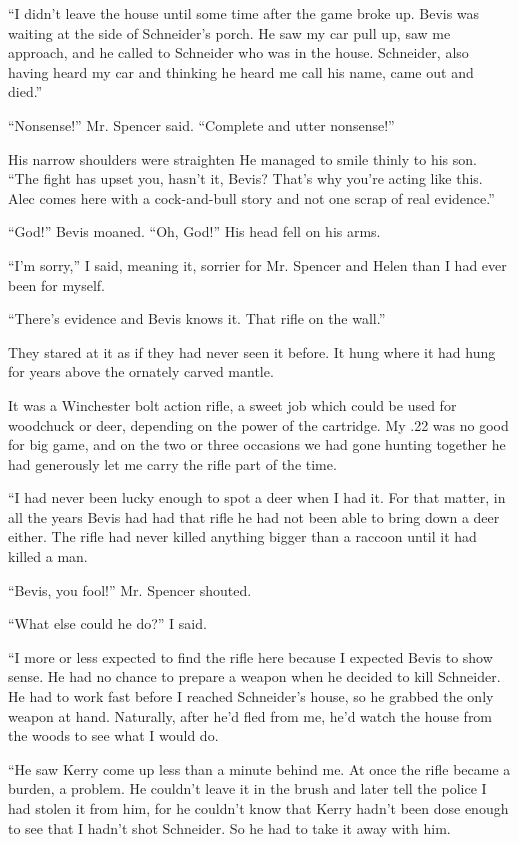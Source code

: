 \documentclass{novel}
\begin{document}
“I didn’t leave the house until some time after the game broke up. Bevis was waiting at the side of Schneider’s porch. He saw my car pull up, saw me approach, and he called to Schneider who was in the house. Schneider, also having heard my car and thinking he heard me call his name, came out and died.”

“Nonsense!” Mr. Spencer said. “Complete and utter nonsense!” 

His narrow shoulders were straighten He managed to smile thinly to his son. “The fight has upset you, hasn’t it, Bevis? That’s why you’re acting like this. Alec comes here with a cock-and-bull story and not one scrap of real evidence.”

“God!” Bevis moaned. “Oh, God!” His head fell on his arms.

“I’m sorry,” I said, meaning it, sorrier for Mr. Spencer and Helen than I had ever been for myself. 

“There’s evidence and Bevis knows it. That rifle on the wall.”

They stared at it as if they had never seen it before. It hung where it had hung for years above the ornately carved mantle.

\scenestars

It was a Winchester bolt action rifle, a sweet job which could be used for woodchuck or deer, depending on the power of the cartridge. My .22 was no good for big game, and on the two or three occasions we had gone hunting together he had generously let me carry the rifle part of the time. 

“I had never been lucky enough to spot a deer when I had it. For that matter, in all the years Bevis had had that rifle he had not been able to bring down a deer either. The rifle had never killed anything bigger than a raccoon until it had killed a man.

“Bevis, you fool!” Mr. Spencer shouted.

“What else could he do?” I said. 

“I more or less expected to find the rifle here because I expected Bevis to show sense. He had no chance to prepare a weapon when he decided to kill Schneider. He had to work fast before I reached Schneider’s house, so he grabbed the only weapon at hand. Naturally, after he’d fled from me, he’d watch the house from the woods to see what I would do. 

“He saw Kerry come up less than a minute behind me. At once the rifle became a burden, a problem. He couldn’t leave it in the brush and later tell the police I had stolen it from him, for he couldn’t know that Kerry hadn’t been dose enough to see that I hadn’t shot Schneider. So he had to take it away with him.
\end{document}
